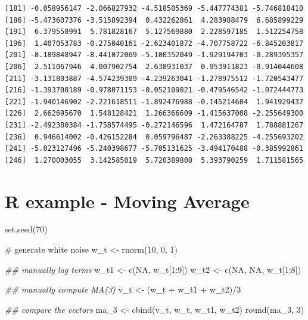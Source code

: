 \documentclass[
  letterpaper,
  DIV=11,
  numbers=noendperiod]{scrreprt}
\newenvironment{Shaded}{\begin{snugshade}}{\end{snugshade}}
\newcommand{\CommentTok}[1]{\textcolor[rgb]{0.37,0.37,0.37}{#1}}
\newcommand{\ConstantTok}[1]{\textcolor[rgb]{0.56,0.35,0.01}{#1}}
\newcommand{\DecValTok}[1]{\textcolor[rgb]{0.68,0.00,0.00}{#1}}
\newcommand{\DocumentationTok}[1]{\textcolor[rgb]{0.37,0.37,0.37}{\textit{#1}}}
\newcommand{\FunctionTok}[1]{\textcolor[rgb]{0.28,0.35,0.67}{#1}}
\newcommand{\NormalTok}[1]{\textcolor[rgb]{0.00,0.23,0.31}{#1}}
\newcommand{\OtherTok}[1]{\textcolor[rgb]{0.00,0.23,0.31}{#1}}
\newcommand{\SpecialCharTok}[1]{\textcolor[rgb]{0.37,0.37,0.37}{#1}}
\begin{document}
\begin{verbatim}
[181] -0.058956147 -2.066827932 -4.518505369 -5.447774381 -5.746818410
[186] -5.473607376 -3.515892394  0.432262861  4.283988479  6.685899229
[191]  6.379550991  5.781828167  5.127569880  2.228597185  1.512254758
[196]  1.407053783 -0.275040161 -2.623401872 -4.707758722 -6.845203817
[201] -8.189848947 -8.441072069 -5.100352049 -1.929194703 -0.289395357
[206]  2.511067946  4.007902754  2.638931037  0.953911823 -0.914044608
[211] -3.131803887 -4.574239309 -4.239263041 -1.278975512 -1.720543477
[216] -1.393708189 -0.978071153 -0.052109821 -0.479546542 -1.072444773
[221] -1.940146902 -2.221618511 -1.892476988 -0.145214604  1.941929437
[226]  2.662695670  1.548128421  1.266366609 -1.415637008 -2.255649300
[231] -2.492380384 -1.758574495 -0.272146596  1.472164787  1.788881267
[236]  0.946614002 -0.426152284  0.059796487 -2.263388225 -4.255693202
[241] -5.023127496 -5.240398677 -5.705131625 -3.494170488 -0.385992861
[246]  1.270003055  3.142585019  5.720389808  5.393790259  1.711581565
\end{verbatim}

\section{R example - Moving Average}\label{r-example---moving-average}

\begin{Shaded}
\begin{Highlighting}[]
\FunctionTok{set.seed}\NormalTok{(}\DecValTok{70}\NormalTok{)}

\CommentTok{\# generate white noise}
\NormalTok{w\_t }\OtherTok{\textless{}{-}} \FunctionTok{rnorm}\NormalTok{(}\DecValTok{10}\NormalTok{, }\DecValTok{0}\NormalTok{, }\DecValTok{1}\NormalTok{)}

\DocumentationTok{\#\# manually lag terms}
\NormalTok{w\_t1 }\OtherTok{\textless{}{-}} \FunctionTok{c}\NormalTok{(}\ConstantTok{NA}\NormalTok{, w\_t[}\DecValTok{1}\SpecialCharTok{:}\DecValTok{9}\NormalTok{])}
\NormalTok{w\_t2 }\OtherTok{\textless{}{-}} \FunctionTok{c}\NormalTok{(}\ConstantTok{NA}\NormalTok{, }\ConstantTok{NA}\NormalTok{, w\_t[}\DecValTok{1}\SpecialCharTok{:}\DecValTok{8}\NormalTok{])}

\DocumentationTok{\#\# manually compute MA(3)}
\NormalTok{v\_t }\OtherTok{\textless{}{-}}\NormalTok{ (w\_t }\SpecialCharTok{+}\NormalTok{ w\_t1 }\SpecialCharTok{+}\NormalTok{ w\_t2)}\SpecialCharTok{/}\DecValTok{3}

\DocumentationTok{\#\# compare the vectors}
\NormalTok{ma\_3 }\OtherTok{\textless{}{-}} \FunctionTok{cbind}\NormalTok{(v\_t, w\_t, w\_t1, w\_t2)}
\FunctionTok{round}\NormalTok{(ma\_3, }\DecValTok{3}\NormalTok{)}
\end{Highlighting}
\end{Shaded}
\end{document}
